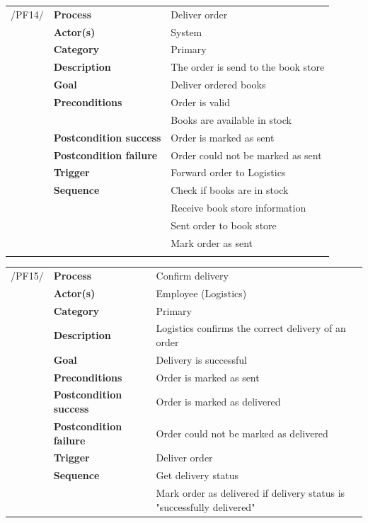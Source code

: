 \documentclass[11pt,a4paper,oneside,svgnames]{report}
\begin{document}
\noindent
\begin{tabular}{p{1.5cm}p{3cm}p{8cm}}
/PF14/	& \textbf{Process} & Deliver order\\
		& \textbf{Actor(s)} & System\\
		& \textbf{Category} & Primary\\
		& \textbf{Description}	 &  The order is send to the book store\\
		& \textbf{Goal} & Deliver ordered books\\
		& \textbf{Preconditions} & Order is valid\\
		& & Books are available in stock\\
		& \textbf{Postcondition success} & Order is marked as sent\\
		& \textbf{Postcondition failure} & Order could not be marked as sent\\
		& \textbf{Trigger} & Forward order to Logistics\\
		& \textbf{Sequence} & Check if books are in stock\\
		& & Receive book store information\\
		& & Sent order to book store\\
		& & Mark order as sent\\
		
\hfill \\
\end{tabular}

\noindent
\begin{tabular}{p{1.5cm}p{3cm}p{8cm}}
/PF15/	& \textbf{Process} & Confirm delivery\\
		& \textbf{Actor(s)} & Employee (Logistics)\\
		& \textbf{Category} & Primary\\
		& \textbf{Description}	 & Logistics confirms the correct delivery of an order\\
		& \textbf{Goal} & Delivery is successful\\
		& \textbf{Preconditions} & Order is marked as sent\\
		& \textbf{Postcondition success} & Order is marked as delivered\\
		& \textbf{Postcondition failure} & Order could not be marked as delivered\\
		& \textbf{Trigger} & Deliver order\\
		& \textbf{Sequence} & Get delivery status\\
		& & Mark order as delivered if delivery status is "successfully delivered"
		
\hfill \\
\end{tabular}
\end{document}
